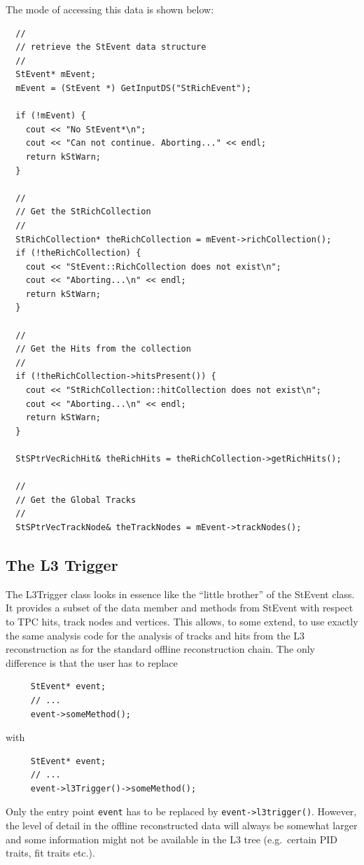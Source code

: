 \documentclass[twoside]{article}
\begin{document}
The mode of accessing this data is shown below:

\begin{verbatim}
  //
  // retrieve the StEvent data structure
  //
  StEvent* mEvent;
  mEvent = (StEvent *) GetInputDS("StRichEvent");

  if (!mEvent) {
    cout << "No StEvent*\n";
    cout << "Can not continue. Aborting..." << endl;
    return kStWarn;
  }

  //
  // Get the StRichCollection
  // 
  StRichCollection* theRichCollection = mEvent->richCollection();
  if (!theRichCollection) {
    cout << "StEvent::RichCollection does not exist\n";
    cout << "Aborting...\n" << endl;
    return kStWarn;
  }

  //
  // Get the Hits from the collection
  //
  if (!theRichCollection->hitsPresent()) {
    cout << "StRichCollection::hitCollection does not exist\n";
    cout << "Aborting...\n" << endl;
    return kStWarn;
  }

  StSPtrVecRichHit& theRichHits = theRichCollection->getRichHits();

  //
  // Get the Global Tracks
  //
  StSPtrVecTrackNode& theTrackNodes = mEvent->trackNodes();
\end{verbatim}

\subsection{The L3 Trigger}

The L3Trigger class looks in essence like the ``little brother'' of
the StEvent class. It provides a subset of the data member and methods
from StEvent with respect to TPC hits, track nodes and vertices.  This
allows, to some extend, to use exactly the same analysis code for the
analysis of tracks and hits from the L3 reconstruction as for the
standard offline reconstruction chain.
The only difference is that
the user has to replace
\begin{verbatim}
     StEvent* event;
     // ...
     event->someMethod();
\end{verbatim}
with
\begin{verbatim}
     StEvent* event;
     // ...
     event->l3Trigger()->someMethod();
\end{verbatim}
Only the entry point \texttt{event} has to be replaced by \texttt{event->l3trigger()}.
However, the level of detail in the offline reconstructed data will
always be somewhat larger and some information might not be available in the L3
tree (e.g.~certain PID traits, fit traits etc.).
\end{document}

